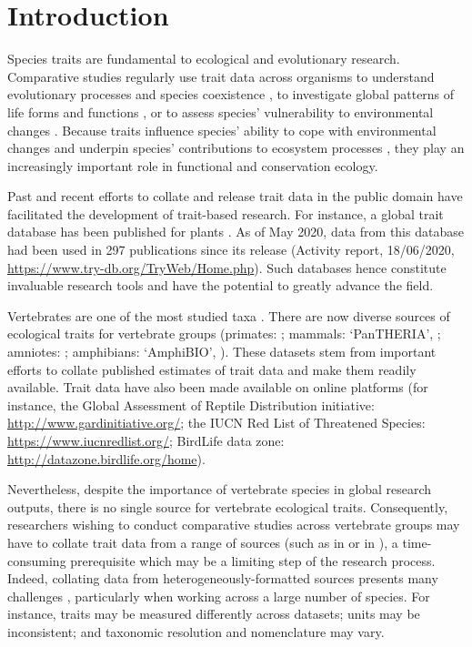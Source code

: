\section{Introduction}
Species traits are fundamental to ecological and evolutionary research. Comparative studies regularly use trait data across organisms to understand evolutionary processes and species coexistence \citep{Escudero2016, Zamudio2016}, to investigate global patterns of life forms and functions \citep{Diaz2016}, or to assess species’ vulnerability to environmental changes \citep{Bohm2016, Pacifici2015, Pearson2014}. Because traits influence species’ ability to cope with environmental changes \citep{Newbold2013} and underpin species’ contributions to ecosystem processes \citep{Lavorel2002a, Violle2007, Wong2018}, they play an increasingly important role in functional and conservation ecology.

Past and recent efforts to collate and release trait data in the public domain have facilitated the development of trait-based research. For instance, a global trait database has been published for plants \citep{Kattge2011}. As of May 2020, data from this database had been used in 297 publications since its release (Activity report, 18/06/2020, \url{https://www.try-db.org/TryWeb/Home.php}). Such databases hence constitute invaluable research tools and have the potential to greatly advance the field.

Vertebrates are one of the most studied taxa \citep{Titley2017}. There are now diverse sources of ecological traits for vertebrate groups (primates: \cite{Galan-Acedo2019}; mammals: `PanTHERIA', \cite{Jones2009}; amniotes: \cite{Myhrvold2015}; amphibians: ‘AmphiBIO’, \cite{Oliveira2017}). These datasets stem from important efforts to collate published estimates of trait data and make them readily available. Trait data have also been made available on online platforms (for instance, the Global Assessment of Reptile Distribution initiative: \url{http://www.gardinitiative.org/}; the IUCN Red List of Threatened Species: \url{https://www.iucnredlist.org/}; BirdLife data zone: \url{http://datazone.birdlife.org/home}).

Nevertheless, despite the importance of vertebrate species in global research outputs, there is no single source for vertebrate ecological traits. Consequently, researchers wishing to conduct comparative studies across vertebrate groups may have to collate trait data from a range of sources (such as in \citet{Cooke2019a, Cooke2019b} or in \citet{Gonzalez2018}), a time-consuming prerequisite which may be a limiting step of the research process. Indeed, collating data from heterogeneously-formatted sources presents many challenges \citep{Schneider2019}, particularly when working across a large number of species. For instance, traits may be measured differently across datasets; units may be inconsistent; and taxonomic resolution and nomenclature may vary.

